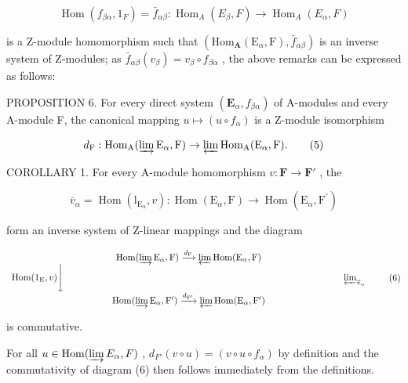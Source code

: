 \[
\operatorname{Hom} (f _ {\beta \alpha}, 1 _ {F}) = \bar {f} _ {\alpha \beta}: \operatorname{Hom} _ {A} (E _ {\beta}, F) \rightarrow \operatorname{Hom} _ {A} (E _ {\alpha}, F)
\]

is a Z-module homomorphism such that \((\mathrm{Hom}_{\mathbf{A}}(\mathrm{E}_{\alpha},\mathrm{F}),\bar{f}_{\alpha\beta})\) is an inverse system of Z-modules; as \(\bar{f}_{\alpha\beta}(v_{\beta}) = v_{\beta} \circ f_{\beta\alpha}\) , the above remarks can be expressed as follows:

PROPOSITION 6. For every direct system \((\mathbf{E}_{\alpha}, f_{\beta \alpha})\) of A-modules and every A-module F, the canonical mapping \(u \mapsto (u \circ f_{\alpha})\) is a Z-module isomorphism

\[
d _ {\mathrm{F}}: \operatorname{Hom} _ {\mathrm{A}} (\varinjlim \mathrm{E} _ {\alpha}, \mathrm{F}) \rightarrow \varprojlim \operatorname{Hom} _ {\mathrm{A}} (\mathrm{E} _ {\alpha}, \mathrm{F}).\tag{5}
\]

COROLLARY 1. For every A-module homomorphism \(v: \mathbf{F} \to \mathbf{F}'\) , the

\[
\bar {v} _ {\alpha} = \operatorname{Hom} \left(\mathrm{l} _ {\mathrm{E} _ {\alpha}}, v\right): \operatorname{Hom} \left(\mathrm{E} _ {\alpha}, \mathrm{F}\right)\rightarrow \operatorname{Hom} \left(\mathrm{E} _ {\alpha}, \mathrm{F} ^ {\prime}\right)
\]

form an inverse system of Z-linear mappings and the diagram

\[
\begin{array}{c} \operatorname{Hom} (\varinjlim \mathrm{E} _ {\alpha}, \mathrm{F}) \xrightarrow {d _ {\mathrm{F}}} \varprojlim \operatorname{Hom} (\mathrm{E} _ {\alpha}, \mathrm{F}) \\ \operatorname{Hom} (1 _ {\mathrm{E}}, v) \Bigg \downarrow \qquad \qquad \qquad \qquad \qquad \qquad \qquad \qquad \qquad \qquad \qquad \qquad \qquad \qquad \qquad \varprojlim_ {\overline {{v}} _ {\alpha}} \\ \operatorname{Hom} (\varinjlim \mathrm{E} _ {\alpha}, \mathrm{F} ^ {\prime}) \xrightarrow {d _ {\mathrm{F} ^ {\prime}}} \varprojlim \operatorname{Hom} (\mathrm{E} _ {\alpha}, \mathrm{F} ^ {\prime}) \end{array}\tag{6}
\]

is commutative.

For all \(u \in \operatorname{Hom}(\varinjlim E_{\alpha}, F)\) , \(d_{F'}(v \circ u) = (v \circ u \circ f_{\alpha})\) by definition and the commutativity of diagram (6) then follows immediately from the definitions.

